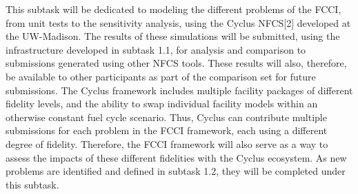This subtask will be dedicated to modeling the different problems of the
\gls{FCCI}, from unit tests to the sensitivity analysis, using the Cyclus
\gls{NFCS}[2] developed at the UW-Madison. The results of these simulations
will be submitted, using the infrastructure developed in subtask 1.1, for
analysis and comparison to submissions generated using other \gls{NFCS}
tools. These results will also, therefore, be available to other participants
as part of the comparison set for future submissions. The Cyclus framework
includes multiple facility packages of different fidelity levels, and the
ability to swap individual facility models within an otherwise constant fuel
cycle scenario. Thus, Cyclus can contribute multiple submissions for each
problem in the \gls{FCCI} framework, each using a different degree of
fidelity. Therefore, the \gls{FCCI} framework will also serve as a way to
assess the impacts of these different fidelities with the Cyclus ecosystem. As
new problems are identified and defined in subtask 1.2, they will be completed
under this subtask.


